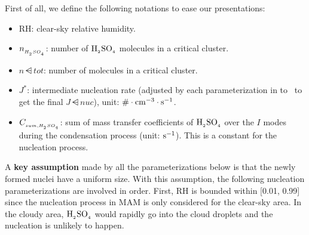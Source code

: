 First of all, we define the following notations to ease our presentations:
\begin{itemize}
\item RH: clear-sky relative humidity.
\item $n_{_{H_{_2}SO_{_4}}}$: number of $\rm H_{_2}SO_{_4}$ molecules in a critical cluster.
\item $n\dsub{tot}$: number of molecules in a critical cluster.
\item $J^*$: intermediate nucleation rate (adjusted by each parameterization
in  to~ to get the final
$J\dsub{nuc}$), unit: $\rm \# \cdot cm^{-3} \cdot s^{-1}$.
\item $C_{_{sum,H_{_2}SO_{_4}}}$: sum of mass transfer coefficients of
$\rm H_{_2}SO_{_4}$ over the $I$ modes during the condensation process (unit:
$\rm s^{-1}$). This is a constant for the nucleation process.
\end{itemize}

A \textbf{key assumption} made by all the parameterizations below
is that the newly formed nuclei have a uniform size. With this assumption,
the following nucleation parameterizations are involved in order.
First, RH is bounded within [0.01, 0.99] since the nucleation process in
MAM is only considered for the clear-sky area. In the cloudy area, $\rm H_{_2}SO_{_4}$
would rapidly go into the cloud droplets and the nucleation is unlikely
to happen.

